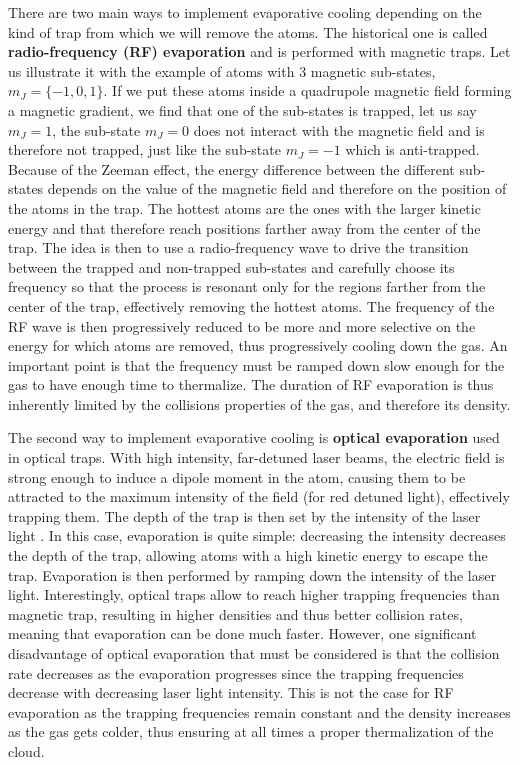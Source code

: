 There are two main ways to implement evaporative cooling depending on the kind of trap from which we will remove the atoms. The historical one is called \textbf{radio-frequency (RF) evaporation} \cite{dos2001penning,ketterle1996evaporative,robert2001bose} and is performed with magnetic traps. Let us illustrate it with the example of atoms with 3 magnetic sub-states, $m_J=\{-1,0,1\}$. If we put these atoms inside a quadrupole magnetic field forming a magnetic gradient, we find that one of the sub-states is trapped, let us say $m_J=1$, the sub-state $m_J=0$ does not interact with the magnetic field and is therefore not trapped, just like the sub-state $m_J=-1$ which is anti-trapped. Because of the Zeeman effect, the energy difference between the different sub-states depends on the value of the magnetic field and therefore on the position of the atoms in the trap. The hottest atoms are the ones with the larger kinetic energy and that therefore reach positions farther away from the center of the trap. The idea is then to use a radio-frequency wave to drive the transition between the trapped and non-trapped sub-states and carefully choose its frequency so that the process is resonant only for the regions farther from the center of the trap, effectively removing the hottest atoms. The frequency of the RF wave is then progressively reduced to be more and more selective on the energy for which atoms are removed, thus progressively cooling down the gas. An important point is that the frequency must be ramped down slow enough for the gas to have enough time to thermalize. The duration of RF evaporation is thus inherently limited by the collisions properties of the gas, and therefore its density.

The second way to implement evaporative cooling is \textbf{optical evaporation} used in optical traps. With high intensity, far-detuned laser beams, the electric field is strong enough to induce a dipole moment in the atom, causing them to be attracted to the maximum intensity of the field (for red detuned light), effectively trapping them. The depth of the trap is then set by the intensity of the laser light \cite{grimm2000optical}. In this case, evaporation is quite simple: decreasing the intensity decreases the depth of the trap, allowing atoms with a high kinetic energy to escape the trap. Evaporation is then performed by ramping down the intensity of the laser light. Interestingly, optical traps allow to reach higher trapping frequencies than magnetic trap, resulting in higher densities and thus better collision rates, meaning that evaporation can be done much faster. However, one significant disadvantage of optical evaporation that must be considered is that the collision rate decreases as the evaporation progresses since the trapping frequencies decrease with decreasing laser light intensity. This is not the case for RF evaporation as the trapping frequencies remain constant and the density increases as the gas gets colder, thus ensuring at all times a proper thermalization of the cloud.

